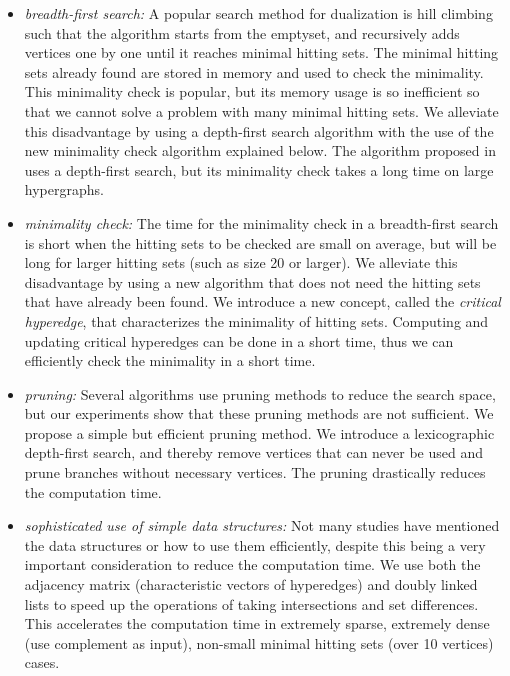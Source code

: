 \begin{itemize}
\item {\em breadth-first search:} A popular search method for dualization is
 hill climbing such that the algorithm starts from the emptyset, 
and recursively adds vertices one by one until it reaches minimal hitting sets.
 The minimal hitting sets already found are stored in memory and used to
 check the minimality.
This minimality check is popular, but its memory usage is so inefficient
 so that we cannot solve a problem with many minimal hitting sets.
We alleviate this disadvantage by using a depth-first search algorithm
 with the use of the new minimality check algorithm explained below.
The algorithm proposed in \cite{KvSt99,KvSt05} uses a depth-first search,
 but its minimality check takes a long time on large hypergraphs.

\item {\em minimality check:} The time for the minimality check in a
 breadth-first search is short when the hitting sets to be checked are
 small on average, but will be long for larger hitting sets (such as size
 20 or larger).
We alleviate this disadvantage by using a new algorithm
 that does not need the hitting sets that have already been found.
We introduce a new concept, called the {\em critical hyperedge}, 
 that characterizes the minimality of hitting sets.
Computing and updating critical hyperedges can be done in a short time,
 thus we can efficiently check the minimality in a short time.

\item {\em pruning:} Several algorithms use pruning methods to reduce the
 search space, but our experiments show that these pruning methods are not
 sufficient.
We propose a simple but efficient pruning method.
We introduce a lexicographic depth-first search, and thereby remove vertices
 that can never be used and prune branches without necessary vertices.
The pruning drastically reduces the computation time.

\item {\em sophisticated use of simple data structures:}
Not many studies have mentioned the data structures or how to use them
 efficiently, despite this being a very important consideration to reduce
 the computation time.
We use both the adjacency matrix (characteristic vectors of hyperedges)
 and doubly linked lists to speed up the operations of taking intersections
 and set differences.
This accelerates the computation time in extremely sparse, extremely
 dense (use complement as input), non-small minimal hitting sets (over 10
 vertices) cases.
\end{itemize}

